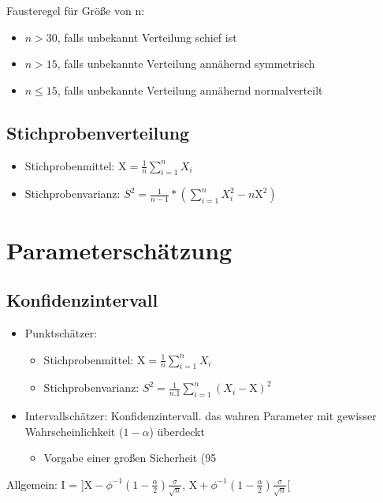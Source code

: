 \documentclass[10pt,landscape,a4paper]{article}
\begin{document}
\begin{multicols}{3}
Fausteregel für Größe von n:
\begin{itemize}
	\setlength\itemsep{-0.2em}
	\item $n>30$, falls unbekannt Verteilung schief ist
	\item $n>15$, falls unbekannte Verteilung annähernd symmetrisch
	\item $n \leq 15$, falls unbekannte Verteilung annähernd normalverteilt
\end{itemize}

\subsection{Stichprobenverteilung}
\begin{itemize}
	\setlength\itemsep{-0.2em}
	\item Stichprobenmittel: $\text{\={X}} = \frac{1}{n} \sum\limits_{i=1}^n X_i$
	\item Stichprobenvarianz: $S^2 = \frac{1}{n-1} * (\sum\limits_{i=1}^n X_i^2 - n \text{\={X}}^2)$
\end{itemize}


\section{Parameterschätzung}
\subsection{Konfidenzintervall}
\begin{itemize}
	\setlength\itemsep{-0.2em}
	\item Punktschätzer:
	\begin{itemize}
		\setlength\itemsep{-0.2em}
		\item Stichprobenmittel: $\text{\={X}} = \frac{1}{n} \sum\limits_{i=1}^n X_i$
		\item Stichprobenvarianz: $S^2 = \frac{1}{n.1} \sum\limits_{i=1}^n (X_i - \text{\={X}})^2$
	\end{itemize}
	\item Intervallschätzer: Konfidenzintervall. das wahren Parameter mit gewisser Wahrscheinlichkeit ($1-\alpha$) überdeckt
	\begin{itemize}
		\setlength\itemsep{-0.2em}
		\item Vorgabe einer großen Sicherheit (95%
	\end{itemize}
\end{itemize}

Allgemein: I = ]$\text{\={X}} - \phi^{-1} (1- \frac{\alpha}{2}) \frac{\sigma}{\sqrt{n}} $, $ \text{\={X}} + \phi^{-1} (1- \frac{\alpha}{2}) \frac{\sigma}{\sqrt{n}}$[


\end{multicols}
\end{document}
